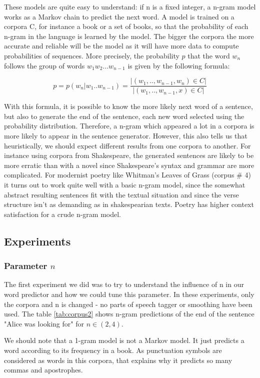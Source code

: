 \documentclass[a4paper,12pt]{article}
\begin{document}
These models are quite easy to understand: if n is a fixed integer, a n-gram model works as a Markov chain to predict the next word. A model is trained on a corpora C, for instance a book or a set of books, so that the probability of each n-gram in the language is learned by the model. The bigger the corpora the more accurate and reliable will be the model as it will have more data to compute probabilities of sequences. More precisely, the probability $p$ that the word $w_n$ follows the group of words $w_1 w_2 ... w_{n-1}$ is given by the following formula:

$$ p = p(w_n | w_1 .. w_{n-1}) = \frac{|{(w_1, .., w_{n-1}, w_n) \in C}|}{|{(w_1, .., w_{n-1}, x) \in C}|} $$

With this formula, it is possible to know the more likely next word of a sentence, but also to generate the end of the sentence, each new word selected using the probability distribution. Therefore, a n-gram which appeared a lot in a corpora is more likely to appear in the sentence generator. However, this also tells us that heuristically, we should expect different results from one corpora to another. For instance using corpora from Shakespeare, the generated sentences are likely to be more erratic than with a novel since Shakespeare's syntax and grammar are more complicated. For modernist poetry like Whitman's Leaves of Grass (corpus \# 4) it turns out to work quite well with a basic n-gram model, since the somewhat abstract resulting sentences fit with the textual situation and since the verse structure isn't as demanding as in shakespearian texts. Poetry has higher context satisfaction for a crude n-gram model.

\subsection{Experiments}
\subsubsection{Parameter $n$}
	The first experiment we did was to try to understand the influence of n in our word predictor and how we could tune this parameter. In these experiments, only the corpora and n is changed - no parts of speech tagger or smoothing have been used. The table \ref{tab:corpus2} shows n-gram predictions of the end of the sentence "Alice was looking for" for $ n\in(2,4) $.
	
We should note that a 1-gram model is not a Markov model. It just predicts a word according to its frequency in a book. As punctuation symbols are considered as words in this corpora, that explains why it predicts so many commas and apostrophes. 
\end{document}
